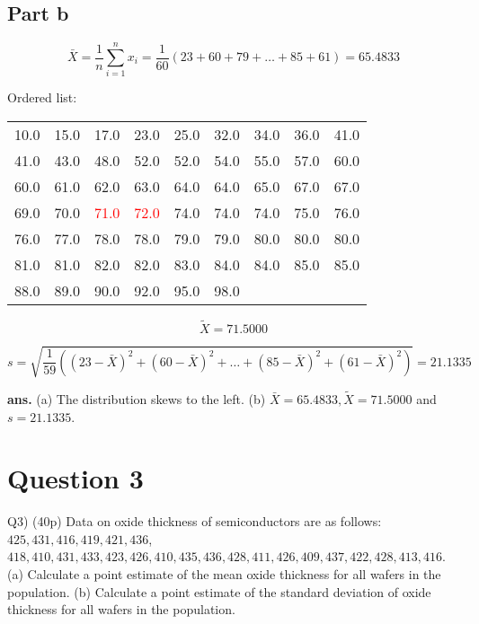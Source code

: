 \documentclass[12pt]{article}
\begin{document}
\AnswerTag

\subsection*{Part b}



\[ \bar{X} = \frac{1}{n} \sum_{i=1}^{n} x_i = \frac{1}{60}(23 + 60 + 79 + \ldots + 85 + 61) = 65.4833\] 

Ordered list:
\begin{center}
\begin{tabular}{rrrrrrrrr}
\toprule
10.0 & 15.0 & 17.0 & 23.0 & 25.0 & 32.0 & 34.0 & 36.0 & 41.0 \\
41.0 & 43.0 & 48.0 & 52.0 & 52.0 & 54.0 & 55.0 & 57.0 & 60.0 \\
60.0 & 61.0 & 62.0 & 63.0 & 64.0 & 64.0 & 65.0 & 67.0 & 67.0 \\
69.0 & 70.0 & \textcolor{red}{71.0} & \textcolor{red}{72.0} & 74.0 & 74.0 & 74.0 & 75.0 & 76.0 \\
76.0 & 77.0 & 78.0 & 78.0 & 79.0 & 79.0 & 80.0 & 80.0 & 80.0 \\
81.0 & 81.0 & 82.0 & 82.0 & 83.0 & 84.0 & 84.0 & 85.0 & 85.0 \\
88.0 & 89.0 & 90.0 & 92.0 & 95.0 & 98.0 &  &  &  \\
\bottomrule
\end{tabular}
\end{center}
\[
\tilde{X}=71.5000
\]


   \[ s = \sqrt{\frac{1}{59}((23 - \bar{X})^2 + (60 - \bar{X})^2 + \ldots + (85 - \bar{X})^2 + (61 - \bar{X})^2)} = 21.1335\]

\AnswerTag

\vfill
\begin{flushright}
\textbf{ans.} (a) The distribution skews to the left. (b) \(\bar{X}=65.4833, \tilde{X}=71.5000\) and \(s=21.1335\).
\end{flushright}





\newpage
\section*{Question 3}
\begin{q}
Q3) (40p) Data on oxide thickness of semiconductors are as follows: \(425,431,416,419,421,436\), \(418,410,431,433,423,426,410,435,436,428,411,426,409,437,422,428,413,416\).
(a) Calculate a point estimate of the mean oxide thickness for all wafers in the population.
(b) Calculate a point estimate of the standard deviation of oxide thickness for all wafers in the population.
\end{q}
\end{document}
